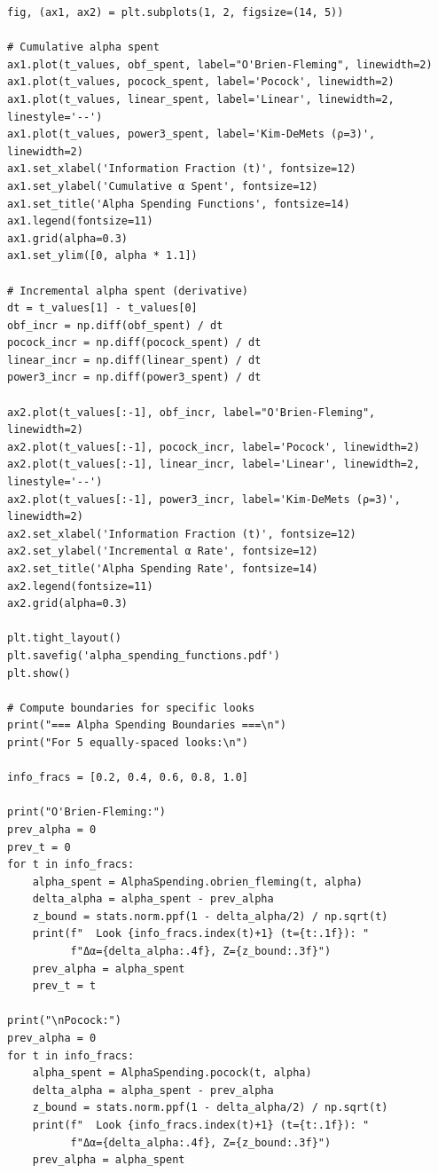 \begin{lstlisting}
fig, (ax1, ax2) = plt.subplots(1, 2, figsize=(14, 5))

# Cumulative alpha spent
ax1.plot(t_values, obf_spent, label="O'Brien-Fleming", linewidth=2)
ax1.plot(t_values, pocock_spent, label='Pocock', linewidth=2)
ax1.plot(t_values, linear_spent, label='Linear', linewidth=2, linestyle='--')
ax1.plot(t_values, power3_spent, label='Kim-DeMets (ρ=3)', linewidth=2)
ax1.set_xlabel('Information Fraction (t)', fontsize=12)
ax1.set_ylabel('Cumulative α Spent', fontsize=12)
ax1.set_title('Alpha Spending Functions', fontsize=14)
ax1.legend(fontsize=11)
ax1.grid(alpha=0.3)
ax1.set_ylim([0, alpha * 1.1])

# Incremental alpha spent (derivative)
dt = t_values[1] - t_values[0]
obf_incr = np.diff(obf_spent) / dt
pocock_incr = np.diff(pocock_spent) / dt
linear_incr = np.diff(linear_spent) / dt
power3_incr = np.diff(power3_spent) / dt

ax2.plot(t_values[:-1], obf_incr, label="O'Brien-Fleming", linewidth=2)
ax2.plot(t_values[:-1], pocock_incr, label='Pocock', linewidth=2)
ax2.plot(t_values[:-1], linear_incr, label='Linear', linewidth=2, linestyle='--')
ax2.plot(t_values[:-1], power3_incr, label='Kim-DeMets (ρ=3)', linewidth=2)
ax2.set_xlabel('Information Fraction (t)', fontsize=12)
ax2.set_ylabel('Incremental α Rate', fontsize=12)
ax2.set_title('Alpha Spending Rate', fontsize=14)
ax2.legend(fontsize=11)
ax2.grid(alpha=0.3)

plt.tight_layout()
plt.savefig('alpha_spending_functions.pdf')
plt.show()

# Compute boundaries for specific looks
print("=== Alpha Spending Boundaries ===\n")
print("For 5 equally-spaced looks:\n")

info_fracs = [0.2, 0.4, 0.6, 0.8, 1.0]

print("O'Brien-Fleming:")
prev_alpha = 0
prev_t = 0
for t in info_fracs:
    alpha_spent = AlphaSpending.obrien_fleming(t, alpha)
    delta_alpha = alpha_spent - prev_alpha
    z_bound = stats.norm.ppf(1 - delta_alpha/2) / np.sqrt(t)
    print(f"  Look {info_fracs.index(t)+1} (t={t:.1f}): "
          f"Δα={delta_alpha:.4f}, Z={z_bound:.3f}")
    prev_alpha = alpha_spent
    prev_t = t

print("\nPocock:")
prev_alpha = 0
for t in info_fracs:
    alpha_spent = AlphaSpending.pocock(t, alpha)
    delta_alpha = alpha_spent - prev_alpha
    z_bound = stats.norm.ppf(1 - delta_alpha/2) / np.sqrt(t)
    print(f"  Look {info_fracs.index(t)+1} (t={t:.1f}): "
          f"Δα={delta_alpha:.4f}, Z={z_bound:.3f}")
    prev_alpha = alpha_spent
\end{lstlisting}

